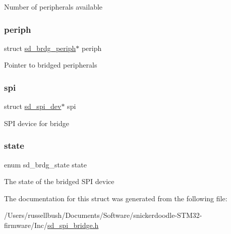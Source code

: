 Number of peripherals available \mbox{\label{structsd__brdg__spi__dev_aa62455b7890e9ba5f38f475b23d6c276}} 
\subsubsection{\texorpdfstring{periph}{periph}}
{\footnotesize\ttfamily struct \mbox{\hyperlink{structsd__brdg__periph}{sd\+\_\+brdg\+\_\+periph}}$\ast$ periph}

Pointer to bridged peripherals \mbox{\label{structsd__brdg__spi__dev_aa6d961a5da962ef8286ac1349a9156d3}} 
\subsubsection{\texorpdfstring{spi}{spi}}
{\footnotesize\ttfamily struct \mbox{\hyperlink{structsd__spi__dev}{sd\+\_\+spi\+\_\+dev}}$\ast$ spi}

S\+PI device for bridge \mbox{\label{structsd__brdg__spi__dev_ac9c8b43ccc97ff45c6a3fb49d30b807e}} 
\subsubsection{\texorpdfstring{state}{state}}
{\footnotesize\ttfamily enum sd\+\_\+brdg\+\_\+state state}

The state of the bridged S\+PI device 

The documentation for this struct was generated from the following file\+:\begin{DoxyCompactItemize}
\item 
/\+Users/russellbush/\+Documents/\+Software/snickerdoodle-\/\+S\+T\+M32-\/firmware/\+Inc/\mbox{\hyperlink{sd__spi__bridge_8h}{sd\+\_\+spi\+\_\+bridge.\+h}}\end{DoxyCompactItemize}
